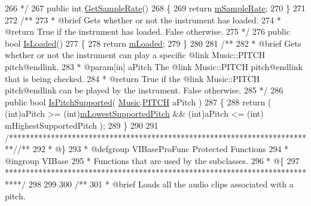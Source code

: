 \begin{DoxyCodeInclude}
266 \textcolor{comment}{     */}
267     \textcolor{keyword}{public} \textcolor{keywordtype}{int} \hyperlink{group___v_i_base_pub_func_ga8be9d452abaf025dc7270c36b3cf379a}{GetSampleRate}()
268     \{
269         \textcolor{keywordflow}{return} \hyperlink{group___v_i_base_pro_var_ga80b3d2ff29b27698eea6bcf2f8ddc5d7}{mSampleRate};
270     \}
271 \textcolor{comment}{}
272 \textcolor{comment}{    /**}
273 \textcolor{comment}{     * @brief Gets whether or not the instrument has loaded.}
274 \textcolor{comment}{     * @return True if the instrument has loaded. False otherwise.}
275 \textcolor{comment}{     */}
276     \textcolor{keyword}{public} \textcolor{keywordtype}{bool} \hyperlink{group___v_i_base_pub_func_gae8b5ac2e3402dfc50ea43f0e91fd9a29}{IsLoaded}()
277     \{
278         \textcolor{keywordflow}{return} \hyperlink{group___v_i_base_pro_var_ga8978807d1878db5aae91fbd057c46097}{mLoaded};
279     \}
280 \textcolor{comment}{}
281 \textcolor{comment}{    /**}
282 \textcolor{comment}{     * @brief Gets whether or not the instrument can play a specific @link Music::PITCH pitch@endlink.}
283 \textcolor{comment}{     * @param[in] aPitch The @link Music::PITCH pitch@endlink that is being checked.}
284 \textcolor{comment}{     * @return True if the @link Music::PITCH pitch@endlink can be played by the instrument. False
       otherwise.}
285 \textcolor{comment}{     */}
286     \textcolor{keyword}{public} \textcolor{keywordtype}{bool} \hyperlink{group___v_i_base_pub_func_ga89655451c108a7ad5cb96ab308e33937}{IsPitchSupported}( \hyperlink{class_music}{Music}.\hyperlink{group___music_enums_ga508f69b199ea518f935486c990edac1d}{PITCH} aPitch )
287     \{
288         \textcolor{keywordflow}{return} ( (\textcolor{keywordtype}{int})aPitch >= (\textcolor{keywordtype}{int})\hyperlink{group___v_i_base_pro_var_ga3cae52b1bcc0178a8a6b03c7aaf7aac8}{mLowestSupportedPitch} && (\textcolor{keywordtype}{int})aPitch <= (\textcolor{keywordtype}{int})
      mHighestSupportedPitch );
289     \}
290 
291     \textcolor{comment}{/*************************************************************************/}\textcolor{comment}{/** }
292 \textcolor{comment}{     * @\}}
293 \textcolor{comment}{     * @defgroup VIBaseProFunc Protected Functions}
294 \textcolor{comment}{     * @ingroup VIBase}
295 \textcolor{comment}{     * Functions that are used by the subclasses.}
296 \textcolor{comment}{     * @\{}
297 \textcolor{comment}{     ****************************************************************************/}
298 
299 \textcolor{comment}{}
300 \textcolor{comment}{    /** }
301 \textcolor{comment}{     * @brief Loads all the audio clips associated with a pitch.}

\end{DoxyCodeInclude}
